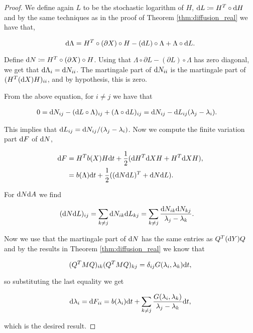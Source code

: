 \begin{proof}
    We define again $L$ to be the stochastic logarithm of $H$, $\mathrm d L \coloneqq H^T \circ \mathrm d H$ and by the same techniques as in the proof of Theorem \ref{thm:diffusion_real} we have that,

    \begin{equation*}
        \mathrm d \Lambda = H^T \circ(\partial X) \circ H - (\mathrm d L)\circ \Lambda + \Lambda \circ \mathrm d L.
    \end{equation*}

    Define $\mathrm d N \coloneqq H^T \circ(\partial X) \circ H$. Using that $\Lambda \circ \partial L -  (\partial L)\circ \Lambda $ has zero diagonal, we get that $\mathrm d \Lambda_i = \mathrm d N_{ii}$. The martingale part of $\mathrm d N_{ii}$ is the martingale part of $(H^T (\mathrm d X) H)_{ii}$, and by hypothesis, this is zero.

    From the above equation, for $i\neq j$ we have that 

    \begin{align*}
        0 &= \mathrm d N_{ij} - (\mathrm d L \circ \Lambda)_{ij} + (\Lambda \circ \mathrm d L)_{ij} = \mathrm d N_{ij} - \mathrm d L_{ij} (\lambda_j - \lambda_i).
    \end{align*}
    
    This implies that $\mathrm d L_{ij} = \mathrm d N_{ij}/(\lambda_j - \lambda_i)$. Now we compute the finite variation part $\mathrm d F$ of $\mathrm d N$,

    \begin{align*}
        \mathrm d F &= H^T b(X) H \mathrm d t + \frac12 (\mathrm d H^T \mathrm d X H + H^T \mathrm d X H), \\ 
        &= b(\Lambda) \mathrm d t + \frac12( (\mathrm d N\mathrm d L)^T + \mathrm d N \mathrm d L).
    \end{align*}

    For $\mathrm d N \mathrm d A$ we find

    \begin{align*}
        (\mathrm d N \mathrm d L)_{ij} &= \sum_{k\neq j} \mathrm d N_{ik}\mathrm d L_{kj} = \sum_{k\neq j} \frac{\mathrm d N_{ik}\mathrm d N_{kj}}{\lambda_j - \lambda_k}.
    \end{align*}

    Now we use that the martingale part of  $\mathrm d N$ has the same entries as $Q^T (\mathrm d Y) Q$ and by the results in Theorem \ref{thm:diffusion_real} we know that 

    \begin{equation*}
        (Q^T M Q)_{ik}(Q^T M Q)_{kj} = \delta_{ij}G(\lambda_i,\lambda_k)\mathrm d t,
    \end{equation*}

    \noindent so substituting the last equality we get

    \begin{equation*}
        \mathrm d \lambda_i = \mathrm d F_{ii} = b(\lambda_i)\mathrm d t + \sum_{k\neq j} \frac{G(\lambda_i,\lambda_k)}{\lambda_j - \lambda_k}\mathrm d t,
    \end{equation*}

    \noindent which is the desired result.
\end{proof}


